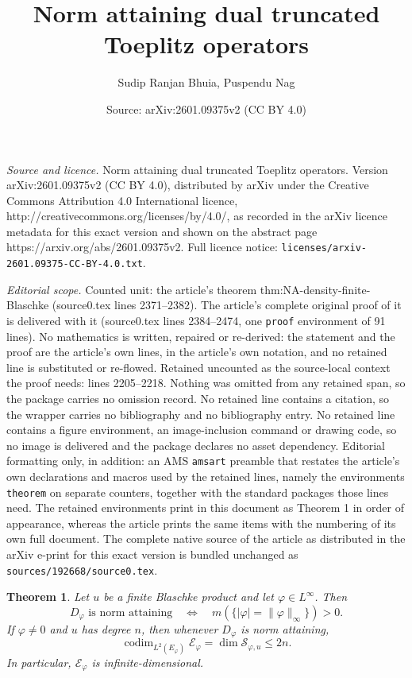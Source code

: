 \documentclass[10pt,a4paper]{amsart}
\title{Norm attaining dual truncated Toeplitz operators}
\author{Sudip Ranjan Bhuia, Puspendu Nag}
\date{Source: arXiv:2601.09375v2 (CC BY 4.0)}
\newtheorem{theorem}{Theorem}
\newcommand{\cle}{\mathcal{E}}
\newcommand{\cls}{\mathcal{S}}
\newcommand{\vp}{\varphi}
\begin{document}
\maketitle

\noindent\emph{Source and licence.} Norm attaining dual truncated Toeplitz operators. Version arXiv:2601.09375v2 (CC BY 4.0), distributed by arXiv under the Creative Commons Attribution 4.0 International licence, http://creativecommons.org/licenses/by/4.0/, as recorded in the arXiv licence metadata for this exact version and shown on the abstract page https://arxiv.org/abs/2601.09375v2. Full licence notice: \texttt{licenses/arxiv-2601.09375-CC-BY-4.0.txt}.\par\smallskip

\noindent\textit{Editorial scope.} Counted unit: the article's theorem thm:NA-density-finite-Blaschke (source0.tex lines 2371--2382). The article's complete original proof of it is delivered with it (source0.tex lines 2384--2474, one \texttt{proof} environment of 91 lines). No mathematics is written, repaired or re-derived: the statement and the proof are the article's own lines, in the article's own notation, and no retained line is substituted or re-flowed.  Retained uncounted as the source-local context the proof needs: lines 2205--2218.  Nothing was omitted from any retained span, so the package carries no omission record.  No retained line contains a citation, so the wrapper carries no bibliography and no bibliography entry.  No retained line contains a figure environment, an image-inclusion command or drawing code, so no image is delivered and the package declares no asset dependency.  Editorial formatting only, in addition: an AMS \texttt{amsart} preamble that restates the article's own declarations and macros used by the retained lines, namely the environments \texttt{theorem} on separate counters, together with the standard packages those lines need.  The retained environments print in this document as Theorem 1 in order of appearance, whereas the article prints the same items with the numbering of its own full document.  The complete native source of the article as distributed in the arXiv e-print for this exact version is bundled unchanged as \texttt{sources/192668/source0.tex}.
\begin{theorem}\label{thm:finite-Blaschke-norm-attainment}
Let $u$ be a finite Blaschke product and let $\vp\in L^\infty$. Then
\[
D_\vp\text{ is norm attaining}\quad\Longleftrightarrow\quad
m\left(\{|\vp|=\|\vp\|_\infty\}\right)>0.
\]
If $\vp\neq0$ and $u$ has degree $n$, then whenever $D_\vp$ is norm
attaining,
\[
\operatorname{codim}_{L^2(E_\vp)}\cle_\vp=\dim\cls_{\vp,u}
\leq 2n.
\]
In particular, $\cle_\vp$ is infinite-dimensional.
\end{theorem}
\end{document}
